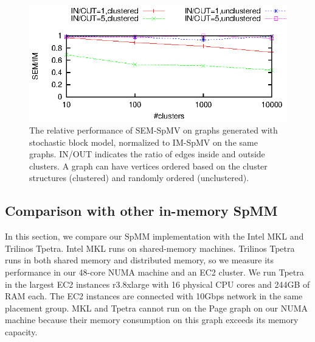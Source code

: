 \begin{figure}
	\begin{center}
		\footnotesize
		\includegraphics[scale=1]{SpMM_figs/spmm-sbm.eps}
		\caption{The relative performance of SEM-SpMV on graphs generated with
			stochastic block model, normalized to IM-SpMV on the same graphs.
			IN/OUT indicates the ratio of edges inside and outside clusters.
			A graph can have vertices ordered based on the cluster structures
		(clustered) and randomly ordered (unclustered).}
		\label{perf:spmm_sbm}
	\end{center}
\end{figure}

\subsection{Comparison with other in-memory SpMM}
In this section, we compare our SpMM implementation with the Intel MKL and
Trilinos Tpetra. Intel MKL runs on shared-memory machines. Trilinos Tpetra runs in
both shared memory and distributed memory, so we measure its performance in
our 48-core NUMA machine and an EC2 cluster. We run Tpetra in the largest
EC2 instances r3.8xlarge with 16 physical CPU cores and 244GB of RAM each.
The EC2 instances are connected with 10Gbps network in the same placement
group. MKL and Tpetra cannot run on the Page graph on our NUMA machine because
their memory consumption on this graph exceeds its memory capacity.

